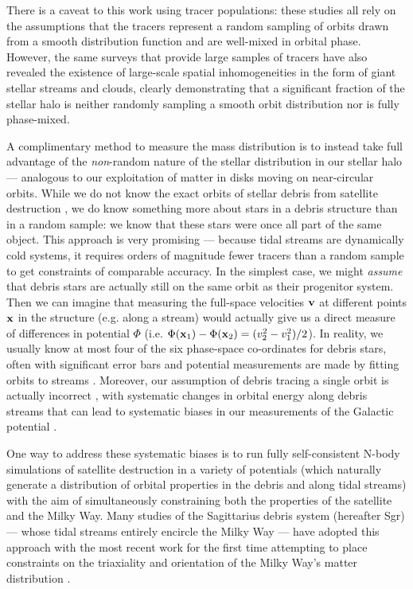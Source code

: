 \documentclass[preprint]{aastex}
\begin{document}
There is a caveat to this work using tracer populations: these studies all rely on the assumptions that the tracers  represent a random sampling of orbits drawn from a
smooth distribution function and are well-mixed in orbital phase.
However, the same surveys that provide large samples of tracers have also revealed the existence of large-scale spatial inhomogeneities in the form of giant stellar
streams and clouds\citep{newberg01,majewski03,belokurov05}, clearly demonstrating that  a significant fraction of the stellar halo is neither randomly sampling a smooth
orbit distribution nor is fully phase-mixed.

A complimentary method to measure the mass distribution is to instead take full advantage of the {\it non}-random nature of the stellar distribution in our stellar halo ---
analogous to our exploitation of matter in disks moving on near-circular orbits.
While we do not know the exact orbits of  stellar debris from satellite destruction \citep[although][proposes a method of orbit reconstruction from limited dimensions of
observations]{eyre08}, we do know something more about stars in a debris structure than in a random sample: we know that these stars were once all part of the same
object.
This approach is very promising --- because tidal streams are dynamically cold systems, it requires orders of magnitude fewer tracers than a random sample to get
constraints of comparable accuracy.
In the simplest case, we might {\it assume} that debris stars are actually still on the same orbit as their progenitor system.
Then we can imagine that measuring the full-space velocities ${\bf v}$ at different points ${\bf x}$ in the structure (e.g. along a stream) would actually give us a direct
measure of differences in potential $\Phi$ (i.e. $\Phi({\bf x}_1)-\Phi({\bf x}_2)=(v_2^2-v_1^2)/2$).
In reality, we usually know at most four of the six phase-space co-ordinates for debris stars, often with significant error bars and potential measurements are made by
fitting orbits to streams \citep[e.g.,][]{helmi05,johnston05,koposov10,law10,lux12}.
Moreover, our assumption of debris tracing a single orbit is actually incorrect \citep[see][for discussions of the orbit distribution in tidal debris]{johnston98,helmi99}, with
systematic changes in orbital energy along debris streams that can lead to systematic biases in our measurements of the Galactic potential \citep{eyre09,varghese11}.

One way to address these systematic biases is to run fully self-consistent N-body simulations of satellite destruction in a variety of potentials (which naturally generate a
distribution of orbital properties in the debris and along tidal streams) with the aim of simultaneously constraining both the properties of the satellite and the Milky Way.
Many studies of the Sagittarius debris system (hereafter Sgr)  --- whose tidal streams entirely encircle the Milky Way --- have adopted this approach \citep[e.g.][]
{law05,fellhauer06} with the most recent work for the first time attempting to place constraints on the triaxiality and orientation of the Milky Way's matter distribution
\citep{law11}.
\end{document}
